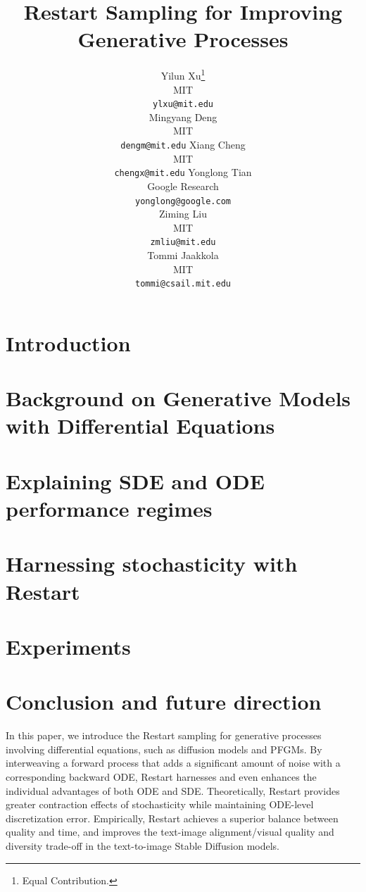 \documentclass{article}
\title{Restart Sampling for Improving Generative Processes }
\author{Yilun Xu\thanks{Equal Contribution.}\\
MIT\\
\texttt{ylxu@mit.edu}\\
\And
Mingyang Deng\footnotemark[1]\\
MIT\\
\texttt{dengm@mit.edu}
\And
Xiang Cheng\footnotemark[1]\\
MIT\\
\texttt{chengx@mit.edu}
  \And
  Yonglong Tian \\
  Google Research \\
  \texttt{yonglong@google.com} \\
  \AND
  Ziming Liu \\
  MIT \\
  \texttt{zmliu@mit.edu} \\
  \And
  Tommi Jaakkola \\
  MIT \\
  \texttt{tommi@csail.mit.edu}
}
\begin{document}
\maketitle


\begin{abstract}

\end{abstract}

\section{Introduction}


\vspace{-3pt}
\section{Background on Generative Models with Differential Equations}
\vspace{-3pt}


\section{Explaining SDE and ODE performance regimes}
\label{sec:dilemma}


\section{Harnessing stochasticity with Restart}



%

\section{Experiments}
\label{sec:exp}



\vspace{-2pt}
\section{Conclusion and future direction}
\label{sec:conclusion}
\vspace{-1pt}

In this paper, we introduce the Restart sampling for generative processes involving differential equations, such as diffusion models and PFGMs. By interweaving a forward process that adds a significant amount of noise with a corresponding backward ODE, Restart harnesses and even enhances the individual advantages of both ODE and SDE. Theoretically, Restart provides greater contraction effects of stochasticity while maintaining ODE-level discretization error. Empirically, Restart achieves a superior balance between quality and time, and improves the text-image alignment/visual quality and diversity trade-off in the text-to-image Stable Diffusion models.
\end{document}

